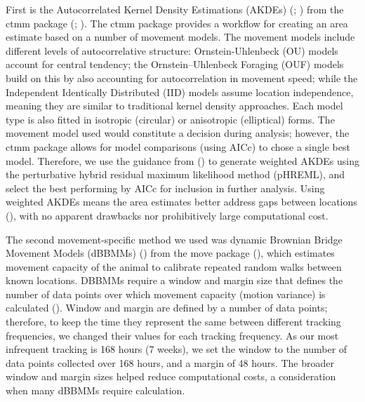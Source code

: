 \documentclass[10pt,a4paper]{article}
\begin{document}
First is the Autocorrelated Kernel Density Estimations (AKDEs) (; ) from the ctmm package (; ).
The ctmm package provides a workflow for creating an area estimate based on a number of movement models.
The movement models include different levels of autocorrelative structure: Ornstein-Uhlenbeck (OU) models account for central tendency; the Ornstein--Uhlenbeck Foraging (OUF) models build on this by also accounting for autocorrelation in movement speed; while the Independent Identically Distributed (IID) models assume location independence, meaning they are similar to traditional kernel density approaches.
Each model type is also fitted in isotropic (circular) or anisotropic (elliptical) forms.
The movement model used would constitute a decision during analysis; however, the ctmm package allows for model comparisons (using AICc) to chose a single best model.
Therefore, we use the guidance from () to generate weighted AKDEs using the perturbative hybrid residual maximum likelihood method (pHREML), and select the best performing by AICc for inclusion in further analysis.
Using weighted AKDEs means the area estimates better address gaps between locations (), with no apparent drawbacks nor prohibitively large computational cost.

The second movement-specific method we used was dynamic Brownian Bridge Movement Models (dBBMMs) () from the move package (), which estimates movement capacity of the animal to calibrate repeated random walks between known locations.
DBBMMs require a window and margin size that defines the number of data points over which movement capacity (motion variance) is calculated ().
Window and margin are defined by a number of data points; therefore, to keep the time they represent the same between different tracking frequencies, we changed their values for each tracking frequency.
As our most infrequent tracking is 168 hours (7 weeks), we set the window to the number of data points collected over 168 hours, and a margin of 48 hours.
The broader window and margin sizes helped reduce computational costs, a consideration when many dBBMMs require calculation.
\end{document}
